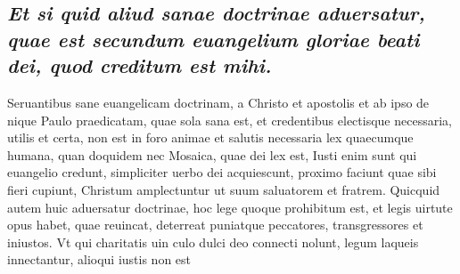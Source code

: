 \documentclass{article}
\begin{document}
\begin{pages}
\subsection*{\textit{Et si quid aliud sanae doctrinae aduersatur, quae est secundum euangelium gloriae beati dei, quod creditum est mihi. }}\pstart Seruantibus sane euangelicam doctrinam, a Christo et apostolis et ab ipso de nique Paulo praedicatam, quae sola sana est, et credentibus electisque necessaria, utilis et certa, non est in foro animae et salutis necessaria lex quaecumque humana, quan doquidem nec Mosaica, quae dei lex est, Iusti enim sunt qui euangelio credunt, simpliciter uerbo dei acquiescunt, proximo faciunt quae sibi fieri cupiunt, Christum amplectuntur ut suum saluatorem et fratrem. Quicquid autem huic aduersatur doctrinae, hoc lege quoque prohibitum est, et legis uirtute opus habet, quae reuincat, deterreat puniatque peccatores, transgressores et iniustos. Vt qui charitatis uin culo dulci deo connecti nolunt, legum laqueis innectantur, alioqui iustis non est  \pend

\end{pages}
\end{document}
